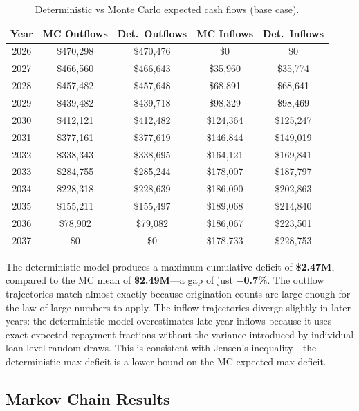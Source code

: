 \documentclass[11pt, letterpaper]{article}
\begin{document}
\begin{table}[H]
  \centering
  \caption{Deterministic vs Monte Carlo expected cash flows (base case).}
  \label{tab:cross_val}
  \begin{tabular}{@{}ccccc@{}}
    \toprule
    \textbf{Year} & \textbf{MC Outflows} & \textbf{Det.\ Outflows} & \textbf{MC Inflows} & \textbf{Det.\ Inflows} \\
    \midrule
    2026 & \$470{,}298 & \$470{,}476 & \$0 & \$0 \\
    2027 & \$466{,}560 & \$466{,}643 & \$35{,}960 & \$35{,}774 \\
    2028 & \$457{,}482 & \$457{,}648 & \$68{,}891 & \$68{,}641 \\
    2029 & \$439{,}482 & \$439{,}718 & \$98{,}329 & \$98{,}469 \\
    2030 & \$412{,}121 & \$412{,}482 & \$124{,}364 & \$125{,}247 \\
    2031 & \$377{,}161 & \$377{,}619 & \$146{,}844 & \$149{,}019 \\
    2032 & \$338{,}343 & \$338{,}695 & \$164{,}121 & \$169{,}841 \\
    2033 & \$284{,}755 & \$285{,}244 & \$178{,}007 & \$187{,}797 \\
    2034 & \$228{,}318 & \$228{,}639 & \$186{,}090 & \$202{,}863 \\
    2035 & \$155{,}211 & \$155{,}497 & \$189{,}068 & \$214{,}840 \\
    2036 & \$78{,}902 & \$79{,}082 & \$186{,}067 & \$223{,}501 \\
    2037 & \$0 & \$0 & \$178{,}733 & \$228{,}753 \\
    \bottomrule
  \end{tabular}
\end{table}

The deterministic model produces a maximum cumulative deficit of \textbf{\$2.47M}, compared to the MC mean of \textbf{\$2.49M}---a gap of just \textbf{$-$0.7\%}. The outflow trajectories match almost exactly because origination counts are large enough for the law of large numbers to apply. The inflow trajectories diverge slightly in later years: the deterministic model overestimates late-year inflows because it uses exact expected repayment fractions without the variance introduced by individual loan-level random draws. This is consistent with Jensen's inequality---the deterministic max-deficit is a lower bound on the MC expected max-deficit.

\subsection{Markov Chain Results}
\end{document}
